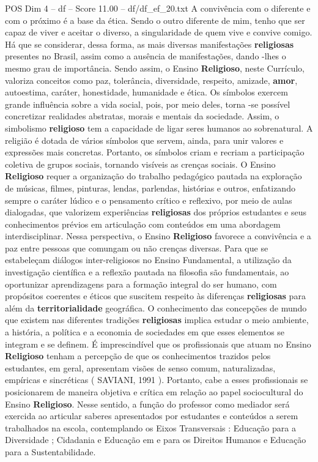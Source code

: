 \begin{textsample}{POS Dim 4 – df – Score 11.00 – df/df\_ef\_20.txt}
A convivência com o diferente e com o próximo é a base da ética.
Sendo o outro diferente de mim, tenho que ser capaz de viver e aceitar o diverso, a singularidade de quem vive e convive comigo.
Há que se considerar, dessa forma, as mais diversas manifestações \textbf{religiosas} presentes no Brasil, assim como a ausência de manifestações, dando -lhes o mesmo grau de importância.
Sendo assim, o Ensino \textbf{Religioso}, neste Currículo, valoriza conceitos como paz, tolerância, diversidade, respeito, amizade, \textbf{amor}, autoestima, caráter, honestidade, humanidade e ética.
Os símbolos exercem grande influência sobre a vida social, pois, por meio deles, torna -se possível concretizar realidades abstratas, morais e mentais da sociedade.
Assim, o simbolismo \textbf{religioso} tem a capacidade de ligar seres humanos ao sobrenatural.
A religião é dotada de vários símbolos que servem, ainda, para unir valores e expressões mais concretas.
Portanto, os símbolos criam e recriam a participação coletiva de grupos sociais, tornando visíveis as crenças sociais.
O Ensino \textbf{Religioso} requer a organização do trabalho pedagógico pautada na exploração de músicas, filmes, pinturas, lendas, parlendas, histórias e outros, enfatizando sempre o caráter lúdico e o pensamento crítico e reflexivo, por meio de aulas dialogadas, que valorizem experiências \textbf{religiosas} dos próprios estudantes e seus conhecimentos prévios em articulação com conteúdos em uma abordagem interdisciplinar.
Nessa perspectiva, o Ensino \textbf{Religioso} favorece a convivência e a paz entre pessoas que comungam ou não crenças diversas.
Para que se estabeleçam diálogos inter-religiosos no Ensino Fundamental, a utilização da investigação científica e a reflexão pautada na filosofia são fundamentais, ao oportunizar aprendizagens para a formação integral do ser humano, com propósitos coerentes e éticos que suscitem respeito às diferenças \textbf{religiosas} para além da \textbf{territorialidade} geográfica.
O conhecimento das concepções de mundo que existem nas diferentes tradições \textbf{religiosas} implica estudar o meio ambiente, a história, a política e a economia de sociedades em que esses elementos se integram e se definem.
É imprescindível que os profissionais que atuam no Ensino \textbf{Religioso} tenham a percepção de que os conhecimentos trazidos pelos estudantes, em geral, apresentam visões de senso comum, naturalizadas, empíricas e sincréticas ( SAVIANI, 1991 ).
Portanto, cabe a esses profissionais se posicionarem de maneira objetiva e crítica em relação ao papel sociocultural do Ensino \textbf{Religioso}.
Nesse sentido, a função do professor como mediador será exercida ao articular saberes apresentados por estudantes e conteúdos a serem trabalhados na escola, contemplando os Eixos Transversais : Educação para a Diversidade ; Cidadania e Educação em e para os Direitos Humanos e Educação para a Sustentabilidade.

\end{textsample}
